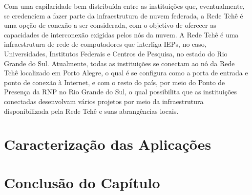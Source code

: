 \documentclass[tese,capa]{texufpel}
\begin{document}
Com uma capilaridade bem distribuída entre as instituições que, eventualmente, se credenciem a fazer parte da infraestrutura de nuvem federada, a Rede Tchê é uma opção de conexão a ser considerada, com o objetivo de oferecer as capacidades de interconexão exigidas pelos nós da nuvem. A Rede Tchê é uma infraestrutura de rede de computadores que interliga IEPs, no caso, Universidades, Institutos Federais e Centros de Pesquisa, no estado do Rio Grande do Sul. Atualmente, todas as instituições se conectam ao nó da Rede Tchê localizado em Porto Alegre, o qual é se configura como a porta de entrada e ponto de conexão à Internet, e com o resto do país, por meio do Ponto de Presença da RNP no Rio Grande do Sul, o qual possibilita que as instituições conectadas desenvolvam vários projetos por meio da infraestrutura disponibilizada pela Rede Tchê e suas abrangências locais.


\section{Caracterização das Aplicações}\label{sec:caracaplic}
\section{Conclusão do Capítulo}\label{sec:concap}

\end{document}
